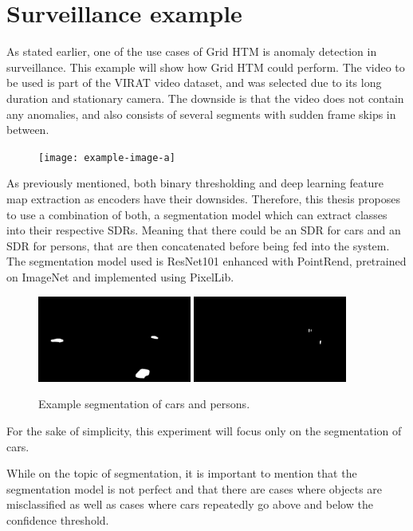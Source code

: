 \section{Surveillance example}
As stated earlier, one of the use cases of Grid HTM is anomaly detection in surveillance. This example will show how Grid HTM could perform.
The video to be used is part of the VIRAT\cite{VIRAT} video dataset, and was selected due to its long duration and stationary camera. The downside is that the video does not contain any anomalies, and also consists of several segments with sudden frame skips in between.
\begin{figure}[H]
    \centering
    \texttt{[image: example-image-a]}
\end{figure}
As previously mentioned, both binary thresholding and deep learning feature map extraction as encoders have their downsides. Therefore, this thesis proposes to use a combination of both, a segmentation model which can extract classes into their respective SDRs. Meaning that there could be an SDR for cars and an SDR for persons, that are then concatenated before being fed into the system. The segmentation model used is ResNet101\cite{resnet} enhanced with PointRend\cite{pointrend}, pretrained on ImageNet\cite{imagenet} and implemented using PixelLib\cite{pixellib}.
\begin{figure}[H]
    \centering
    \includegraphics[width=0.45\textwidth]{resources/methodology/car_segmentation.png}
    \includegraphics[width=0.45\textwidth]{resources/methodology/person_segmentation.png}
    \caption{Example segmentation of cars and persons.}
\end{figure}
For the sake of simplicity, this experiment will focus only on the segmentation of cars.
\par
While on the topic of segmentation, it is important to mention that the segmentation model is not perfect and that there are cases where objects are misclassified as well as cases where cars repeatedly go above and below the confidence threshold.
\par
